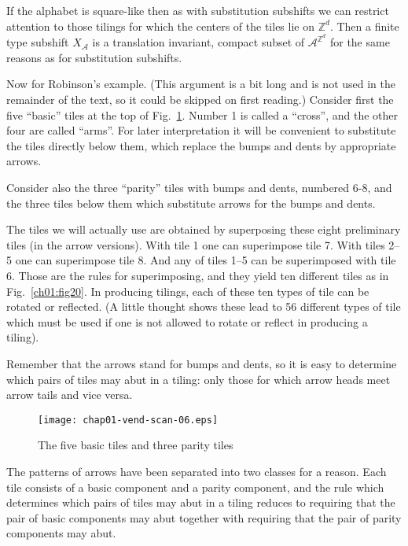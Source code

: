 \documentclass[reqno]{stml-l}
\theoremstyle{plain}
\theoremstyle{definition}
\numberwithin{equation}{chapter}
\begin{document}
If the alphabet is square-like then as with substitution subshifts we can restrict attention to those tilings for which the centers of the tiles lie on $\mathbb{Z}^{d}$. Then a finite type subshift $X_{\mathcal{A}}$ is a translation invariant, compact subset of $\mathcal{A}^{\mathbb{Z}^{d}}$ for the same reasons as for substitution subshifts.

Now for Robinson's example. (This argument is a bit long and is not used in the remainder of the text, so it could be skipped on first reading.) Consider first the five ``basic'' tiles at the top of Fig.~\ref{ch01:fig19}. Number 1 is called a ``cross'', and the other four are called ``arms''. For later interpretation it will be convenient to substitute the tiles directly below them, which replace the bumps and dents by appropriate arrows.

Consider also the three ``parity'' tiles with bumps and dents, numbered 6-8, and the three tiles below them which substitute arrows for the bumps and dents.

The tiles we will actually use are obtained by superposing these eight preliminary tiles (in the arrow versions). With tile 1 one can superimpose tile 7. With tiles 2--5 one can superimpose tile 8. And any of tiles 1--5 can be superimposed with tile 6. Those are the rules for superimposing, and they yield ten different tiles as in Fig.~\ref{ch01:fig20}. In producing tilings, each of these ten types of tile can be rotated or reflected. (A little thought shows these lead to 56 different types of tile which must be used if one is not allowed to rotate or reflect in producing a tiling).

Remember that the arrows stand for bumps and dents, so it is easy to determine which pairs of tiles may abut in a tiling: only those for which arrow heads meet arrow tails and vice versa.

\begin{figure}[h]
\texttt{[image: chap01-vend-scan-06.eps]}
\caption{The five basic tiles and three parity tiles
}
\label{ch01:fig19}
\end{figure}

 The patterns of arrows have been separated into two classes for a reason. Each tile consists of a basic component and a parity component, and the rule which determines which pairs of tiles may abut in a tiling reduces to requiring that the pair of basic components may abut together with requiring that the pair of parity components may abut.
\end{document}
